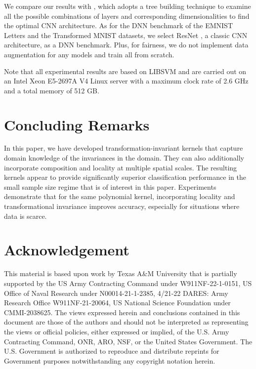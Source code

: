 \documentclass{article}
\theoremstyle{plain}
\theoremstyle{definition}
\theoremstyle{remark}
\begin{document}
We compare our results with \cite{d2020structural}, which adopts a tree building technique to examine all the possible combinations of layers and corresponding dimensionalities to find the optimal CNN architecture. As for the DNN benchmark of the EMNIST Letters and the Transformed MNIST datasets, we select ResNet \cite{he2016deep, he2016identity}, a classic CNN architecture, as a DNN benchmark. Plus, for fairness, we do not implement data augmentation for any models and train all from scratch.

Note that all experimental results are based on LIBSVM \cite{chang2011libsvm} and are carried out on an Intel Xeon E5-2697A V4 Linux server with a maximum clock rate of 2.6 GHz and a total memory of 512 GB.



\section{Concluding Remarks}
In this paper, we have developed transformation-invariant kernels that capture domain knowledge of the invariances in the domain. They can also additionally incorporate composition and locality at multiple spatial scales. The resulting kernels appear to provide significantly superior classification performance in the small sample size regime that is of interest in this paper. Experiments demonstrate that for the same polynomial kernel, incorporating locality and transformational invariance improves accuracy, especially for situations where data is scarce. 



\section*{Acknowledgement}
This material is based upon work by Texas A\&M University that is partially supported by the US Army Contracting Command under W911NF-22-1-0151, US Office of Naval Research under N00014-21-1-2385, 4/21-22 DARES: Army Research Office W911NF-21-20064, US National Science Foundation under CMMI-2038625. The views expressed herein and conclusions contained in this document are those of the authors and should not be interpreted as representing the views or official policies, either expressed or implied, of the U.S. Army Contracting Command, ONR, ARO, NSF, or the United States Government. The U.S. Government is authorized to reproduce and distribute reprints for Government purposes notwithstanding any copyright notation herein.
\end{document}
